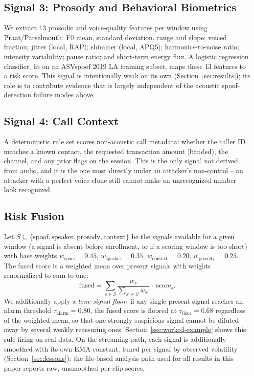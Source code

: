 \documentclass[conference]{IEEEtran}
\begin{document}
\subsection{Signal 3: Prosody and Behavioral Biometrics}
We extract 13 prosodic and voice-quality features per window using
Praat/Parselmouth: F0 mean, standard deviation, range and slope; voiced
fraction; jitter (local, RAP); shimmer (local, APQ5); harmonics-to-noise
ratio; intensity variability; pause ratio; and short-term energy flux.
A logistic regression classifier, fit on an ASVspoof 2019 LA training
subset, maps these 13 features to a risk score. This signal is
intentionally weak on its own (Section~\ref{sec:results}); its role is
to contribute evidence that is largely independent of the acoustic
spoof-detection failure modes above.

\subsection{Signal 4: Call Context}
A deterministic rule set scores non-acoustic call metadata: whether the
caller ID matches a known contact, the requested transaction amount
(banded), the channel, and any prior flags on the session. This is the
only signal not derived from audio, and it is the one most directly
under an attacker's non-control -- an attacker with a perfect voice
clone still cannot make an unrecognized number look recognized.

\subsection{Risk Fusion}
\label{sec:fusion}
Let $S \subseteq \{\text{spoof}, \text{speaker}, \text{prosody},
\text{context}\}$ be the signals available for a given window (a signal
is absent before enrollment, or if a scoring window is too short) with
base weights $w_{\text{spoof}}{=}0.45$, $w_{\text{speaker}}{=}0.35$,
$w_{\text{context}}{=}0.20$, $w_{\text{prosody}}{=}0.25$. The fused
score is a weighted mean over present signals with weights renormalized
to sum to one:
\begin{equation}
\text{fused} = \sum_{s \in S} \frac{w_s}{\sum_{s' \in S} w_{s'}}\, \cdot\, \text{score}_s .
\end{equation}
We additionally apply a \emph{lone-signal floor}: if any single present
signal reaches an alarm threshold $\tau_{\text{alarm}}{=}0.80$, the
fused score is floored at $\tau_{\text{floor}}{=}0.68$ regardless of the
weighted mean, so that one strongly suspicious signal cannot be diluted
away by several weakly reassuring ones. Section~\ref{sec:worked-example}
shows this rule firing on real data. On the streaming path, each
signal is additionally smoothed with its own EMA constant, tuned per
signal by observed volatility (Section~\ref{sec:lessons}); the
file-based analysis path used for all results in this paper reports raw,
unsmoothed per-clip scores.
\end{document}
